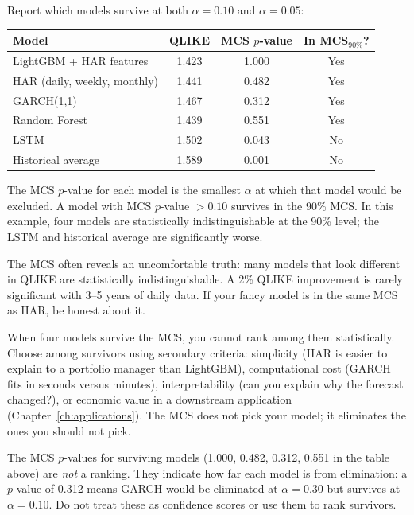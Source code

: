 Report which models survive at both $\alpha = 0.10$ and $\alpha = 0.05$:

\begin{center}
\begin{tabular}{lccc}
\toprule
Model & QLIKE & MCS $p$-value & In MCS$_{90\%}$? \\
\midrule
LightGBM + HAR features & 1.423 & 1.000 & Yes \\
HAR (daily, weekly, monthly) & 1.441 & 0.482 & Yes \\
GARCH(1,1)                   & 1.467 & 0.312 & Yes \\
Random Forest                 & 1.439 & 0.551 & Yes \\
LSTM                          & 1.502 & 0.043 & No  \\
Historical average            & 1.589 & 0.001 & No  \\
\bottomrule
\end{tabular}
\end{center}

The MCS $p$-value for each model is the smallest $\alpha$ at which that model would be excluded.
A model with MCS $p$-value $> 0.10$ survives in the 90\% MCS.
In this example, four models are statistically indistinguishable at the 90\% level; the LSTM and historical average are significantly worse.

\begin{keyidea}
The MCS often reveals an uncomfortable truth: many models that look different in QLIKE are statistically indistinguishable.
A 2\% QLIKE improvement is rarely significant with 3--5 years of daily data.
If your fancy model is in the same MCS as HAR, be honest about it.
\end{keyidea}

\begin{keyidea}
When four models survive the MCS, you cannot rank among them statistically.
Choose among survivors using secondary criteria: simplicity (HAR is easier to explain to a portfolio manager than LightGBM), computational cost (GARCH fits in seconds versus minutes), interpretability (can you explain why the forecast changed?), or economic value in a downstream application (Chapter~\ref{ch:applications}).
The MCS does not pick your model; it eliminates the ones you should not pick.

The MCS $p$-values for surviving models (1.000, 0.482, 0.312, 0.551 in the table above) are \emph{not} a ranking.
They indicate how far each model is from elimination: a $p$-value of 0.312 means GARCH would be eliminated at $\alpha = 0.30$ but survives at $\alpha = 0.10$.
Do not treat these as confidence scores or use them to rank survivors.
\end{keyidea}

